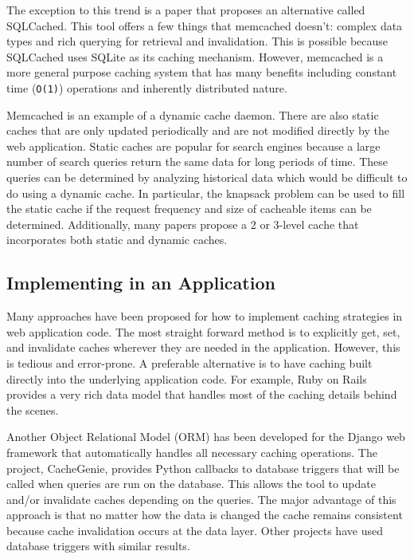 \documentclass[12pt]{ucthesis}
\begin{document}
The exception to this trend is a paper that proposes an alternative called SQLCached.\cite{sqlCached}
This tool offers a few things that memcached doesn't: complex data types and rich querying for retrieval and invalidation.
This is possible because SQLCached uses SQLite as its caching mechanism.
However, memcached is a more general purpose caching system that has many benefits including constant time ({\tt O(1)}) operations and inherently distributed nature.\cite{memcachedDotOrg}

Memcached is an example of a dynamic cache daemon.
There are also static caches that are only updated periodically and are not modified directly by the web application.
Static caches are popular for search engines because a large number of search queries return the same data for long periods of time.
These queries can be determined by analyzing historical data which would be difficult to do using a dynamic cache.\cite{designTradeOffsSearchEngine}
In particular, the knapsack problem can be used to fill the static cache if the request frequency and size of cacheable items can be determined.\cite{designTradeOffsSearchEngine}
Additionally, many papers propose a 2 or 3-level cache that incorporates both static and dynamic caches.\cite{cacheAdmissionPolicies}\cite{designTradeOffsSearchEngine}

\subsection{Implementing in an Application}
Many approaches have been proposed for how to implement caching strategies in web application code.
The most straight forward method is to explicitly get, set, and invalidate caches wherever they are needed in the application.
However, this is tedious and error-prone.\cite{keyBasedCacheExpiration}\cite{triggerBasedORM}
A preferable alternative is to have caching built directly into the underlying application code.
For example, Ruby on Rails provides a very rich data model that handles most of the caching details behind the scenes.\cite{keyBasedCacheExpiration}

Another Object Relational Model (ORM) has been developed for the Django web framework that automatically handles all necessary caching operations.\cite{triggerBasedORM}
The project, CacheGenie, provides Python callbacks to database triggers that will be called when queries are run on the database. This allows the tool to update and/or invalidate caches depending on the queries.
The major advantage of this approach is that no matter how the data is changed the cache remains consistent because cache invalidation occurs at the data layer.
Other projects have used database triggers with similar results.\cite{scalableConsistentCaching}
\end{document}
